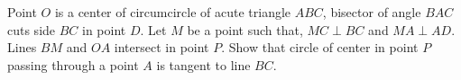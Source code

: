 Point $O$ is a center of circumcircle of acute triangle $ABC$, bisector of angle $BAC$ cuts side $BC$ in point $D$. Let $M$ be a point such that, $MC \perp BC$ and $MA \perp AD$. Lines $BM$ and $OA$ intersect in point $P$. Show that circle of center in point $P$ passing through a point $A$ is tangent to line $BC$.